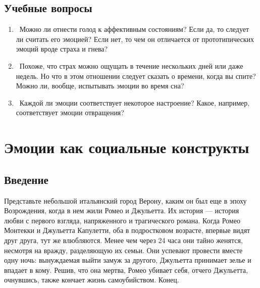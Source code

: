\documentclass[11pt]{book}
\begin{document}
\section{Учебные вопросы}

\begin{tcolorbox}
  \begin{enumerate}
    \item\ Можно ли отнести голод к аффективным состояниям? Если да, то следует ли считать его эмоцией? Если нет, то чем он отличается от прототипических эмоций вроде страха и гнева?
    \item\ Похоже, что страх можно ощущать в течение нескольких дней или даже недель. Но что в этом отношении следует сказать о времени, когда вы спите? Можно ли, вообще, испытывать эмоции во время сна?
    \item\ Каждой ли эмоции соответствует некоторое настроение? Какое, например, соответствует эмоции отвращения?
  \end{enumerate}
\end{tcolorbox}

\chapter{Эмоции как социальные конструкты}

\section{Введение}

Представьте небольшой итальянский город Верону, каким он был еще в эпоху Возрождения, когда в нем жили Ромео и Джульетта. Их история --- история любви с первого взгляда, напряженного и трагического романа. Когда Ромео Монтекки и Джульетта Капулетти, оба в подростковом возрасте, впервые видят друг друга, тут же влюбляются. Менее чем через 24 часа они тайно женятся, несмотря на вражду, разделяющую их семьи. Они успевают провести вместе одну ночь: вынуждаемая выйти замуж за другого, Джульетта принимает зелье и впадает в кому. Решив, что она мертва, Ромео убивает себя, отчего Джульетта, очнувшись, также кончает жизнь самоубийством. Конец.
\end{document}
